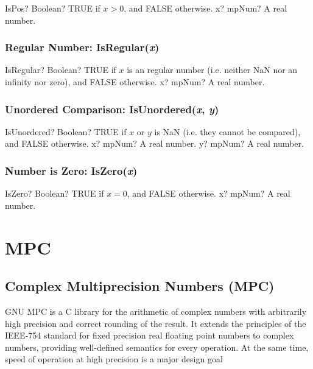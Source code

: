 \begin{mpFunctionsExtract}
	\mpFunctionOne
	{IsPos? Boolean? TRUE if $x > 0$, and FALSE otherwise.}
	{x? mpNum? A real number.}
\end{mpFunctionsExtract}




\subsection{Regular Number: IsRegular(\textit{x})}

\begin{mpFunctionsExtract}
	\mpFunctionOne
	{IsRegular? Boolean? TRUE if $x$ is an regular number (i.e. neither NaN nor an infinity nor zero), and FALSE otherwise.}
	{x? mpNum? A real number.}
\end{mpFunctionsExtract}




\subsection{Unordered Comparison: IsUnordered(\textit{x}, \textit{y})}

\begin{mpFunctionsExtract}
	\mpFunctionTwo
	{IsUnordered? Boolean? TRUE if $x$ or $y$ is NaN (i.e. they cannot be compared), and FALSE otherwise.}
	{x? mpNum? A real number.}
	{y? mpNum? A real number.}
\end{mpFunctionsExtract}




\subsection{Number is Zero: IsZero(\textit{x})}

\begin{mpFunctionsExtract}
	\mpFunctionOne
	{IsZero? Boolean? TRUE if $x = 0$, and FALSE otherwise.}
	{x? mpNum? A real number.}
\end{mpFunctionsExtract}









\chapter{MPC}


\section{Complex Multiprecision Numbers (MPC)}
GNU MPC is a C library for the arithmetic of complex numbers with arbitrarily high precision and correct rounding of the result. It extends the principles of the IEEE-754 standard for fixed precision real floating point numbers to complex numbers, providing well-defined semantics for every operation. At the same time, speed of operation at high precision is a major design goal

